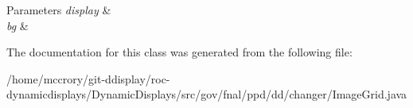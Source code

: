 \begin{DoxyParams}{Parameters}
{\em display} & \\
\hline
{\em bg} & \\
\hline
\end{DoxyParams}


The documentation for this class was generated from the following file\-:\begin{DoxyCompactItemize}
\item 
/home/mccrory/git-\/ddisplay/roc-\/dynamicdisplays/\-Dynamic\-Displays/src/gov/fnal/ppd/dd/changer/Image\-Grid.\-java\end{DoxyCompactItemize}
